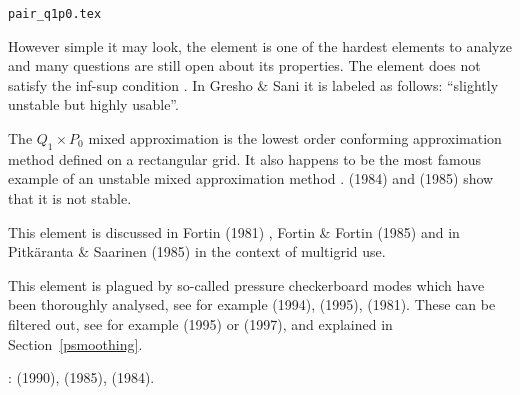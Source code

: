 \begin{flushright} {\tiny {\color{gray} \tt pair\_q1p0.tex}} \end{flushright}


\begin{minipage}{0.48\textwidth}
\begin{center}

\end{center}
\end{minipage}
\begin{minipage}{0.48\textwidth}
\begin{center}

\end{center}
\end{minipage}

However simple it may look, the  element is 
one of the hardest elements to analyze and many questions are still open about its properties. 
The element does not satisfy the inf-sup condition \cite[p211]{hugh}. 
In Gresho \& Sani \cite{grsa} it is labeled as follows: {\color{darkgray}
``slightly unstable but highly usable''}. 

The ${Q}_1 \times P_0$ mixed approximation is the lowest order conforming approximation 
method defined on a rectangular grid. It also happens to be the most famous example 
of an unstable mixed approximation method \cite[p235]{elsw}.
\textcite{boni84} (1984) and \textcite{boni85} (1985) show that it is not stable.

This element is discussed in Fortin (1981) \cite{fort81}, Fortin \& Fortin (1985) \cite{fofo85} 
and in Pitk\"aranta \& Saarinen (1985) \cite{pisa85} in the context of multigrid use.

This element is plagued by so-called pressure checkerboard modes which
have been thoroughly analysed, see for example \textcite{grsi94} (1994), 
\textcite{chpc95} (1995), \textcite{sagl81a,sagl81b} (1981).
These can be filtered out, see for example \textcite{chpc95} (1995) or \textcite{legs79} (1997), 
and explained in Section~\ref{psmoothing}.

\Literature: \textcite{fobo90} (1990), \cite{grle85} (1985),
\textcite{odja84} (1984).

